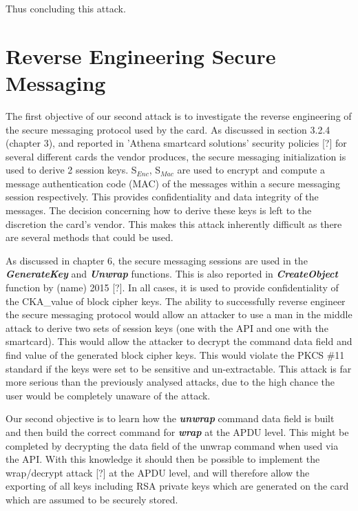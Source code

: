 \documentclass[bsc,frontabs,twoside,singlespacing,parskip,deptreport]{infthesis}     %
\begin{document}
Thus concluding this attack.


\section{Reverse Engineering Secure Messaging}

The first objective of our second attack is to investigate the reverse engineering of the secure messaging protocol used by the card. As discussed in section 3.2.4 (chapter 3), and reported in 'Athena smartcard solutions' security policies [?] for several different cards the vendor produces, the secure messaging initialization is used to derive 2 session keys. S$_{Enc}$, S$_{Mac}$ are used to encrypt and compute a message authentication code (MAC) of the messages within a secure messaging session respectively. This provides confidentiality and data integrity of the messages. The decision concerning how to derive these keys is left to the discretion the card's vendor. This makes this attack inherently difficult as there are several methods that could be used.

As discussed in chapter 6, the secure messaging sessions are used in the \textbf{\textit{GenerateKey}} and \textbf{\textit{Unwrap}} functions. This is also reported in \textbf{\textit{CreateObject}} function by (name) 2015 [?]. In all cases, it is used to provide confidentiality of the CKA\_value of block cipher keys. The ability to successfully reverse engineer the secure messaging protocol would allow an attacker to use a man in the middle attack to derive two sets of session keys (one with the API and one with the smartcard). This would allow the attacker to decrypt the command data field and find value of the generated block cipher keys. This would violate the PKCS \#11 standard if the keys were set to be sensitive and un-extractable. This attack is far more serious than the previously analysed attacks, due to the high chance the user would be completely unaware of the attack.

Our second objective is to learn how the \textbf{\textit{unwrap}} command data field is built and then build the correct command for \textbf{\textit{wrap}} at the APDU level. This might be completed by decrypting the data field of the unwrap command when used via the API. With this knowledge it should then be possible to implement the wrap/decrypt attack [?] at the APDU level, and will therefore allow the exporting of all keys including RSA private keys which are generated on the card which are assumed to be securely stored.
\end{document}
